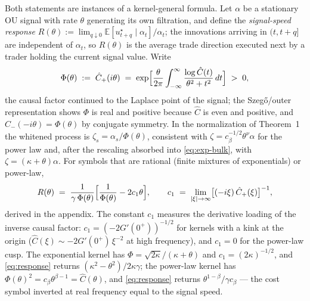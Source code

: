 \documentclass[11pt]{article}
\newcommand{\E}{\mathbb{E}}
\theoremstyle{plain}
\begin{document}
Both statements are instances of a kernel-general formula. Let $\alpha$ be a stationary OU signal with rate $\theta$ generating its own filtration, and define the \emph{signal-speed response} $R(\theta) := \lim_{q\downarrow 0}\E[u^\star_{t+q}\mid\alpha_t]/\alpha_t$; the innovations arriving in $(t,t+q]$ are independent of $\alpha_t$, so $R(\theta)$ is the average trade direction executed next by a trader holding the current signal value. Write
\begin{equation}\label{eq:phi}
\Phi(\theta) \;:=\; \hat C_+(i\theta) \;=\; \exp\Bigl[\frac{\theta}{2\pi}\int_{-\infty}^{\infty}\frac{\log\hat C(t)}{\theta^2+t^2}\,dt\Bigr] \;>\;0,
\end{equation}
the causal factor continued to the Laplace point of the signal; the Szeg\H{o}/outer representation shows $\Phi$ is real and positive because $\hat C$ is even and positive, and $\hat C_-(-i\theta) = \Phi(\theta)$ by conjugate symmetry. In the normalization of Theorem~1 the whitened process is $\zeta_s = \alpha_s/\Phi(\theta)$, consistent with $\zeta = c_\beta^{-1/2}\theta^\nu\alpha$ for the power law and, after the rescaling absorbed into \eqref{eq:exp-bulk}, with $\zeta = (\kappa+\theta)\alpha$. For symbols that are rational (finite mixtures of exponentials) or power-law,
\begin{equation}\label{eq:response}
R(\theta) \;=\; \frac{1}{\gamma\,\Phi(\theta)}\Bigl[\frac{1}{\Phi(\theta)} - 2c_1\theta\Bigr], \qquad c_1 \;=\; \lim_{|\xi|\to\infty}\bigl[(-i\xi)\,\hat C_+(\xi)\bigr]^{-1},
\end{equation}
derived in the appendix. The constant $c_1$ measures the derivative loading of the inverse causal factor: $c_1 = (-2G'(0^+))^{-1/2}$ for kernels with a kink at the origin ($\hat C(\xi)\sim -2G'(0^+)\,\xi^{-2}$ at high frequency), and $c_1 = 0$ for the power-law cusp. The exponential kernel has $\Phi = \sqrt{2\kappa}/(\kappa+\theta)$ and $c_1 = (2\kappa)^{-1/2}$, and \eqref{eq:response} returns $(\kappa^2-\theta^2)/2\kappa\gamma$; the power-law kernel has $\Phi(\theta)^2 = c_\beta\theta^{\beta-1} = \hat C(\theta)$, and \eqref{eq:response} returns $\theta^{1-\beta}/\gamma c_\beta$ --- the cost symbol inverted at real frequency equal to the signal speed.
\end{document}
